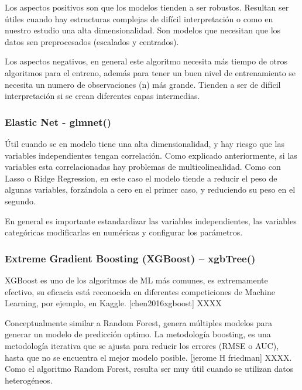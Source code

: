 \documentclass[
]{article}
\begin{document}
Los aspectos positivos son que los modelos tienden a ser robustos.
Resultan ser útiles cuando hay estructuras complejas de difícil
interpretación o como en nuestro estudio una alta dimensionalidad. Son
modelos que necesitan que los datos sen preprocesados (escalados y
centrados).

Los aspectos negativos, en general este algoritmo necesita más tiempo de
otros algoritmos para el entreno, además para tener un buen nivel de
entrenamiento se necesita un numero de observaciones (n) más grande.
Tienden a ser de difícil interpretación si se crean diferentes capas
intermedias.

\hypertarget{elastic-net---glmnet}{%
\subsubsection{Elastic Net - glmnet()}\label{elastic-net---glmnet}}

Útil cuando se en modelo tiene una alta dimensionalidad, y hay riesgo
que las variables independientes tengan correlación. Como explicado
anteriormente, si las variables esta correlacionadas hay problemas de
multicolinealidad. Como con Lasso o Ridge Regression, en este caso el
modelo tiende a reducir el peso de algunas variables, forzándola a cero
en el primer caso, y reduciendo su peso en el segundo.

En general es importante estandardizar las variables independientes, las
variables categóricas modificarlas en numéricas y configurar los
parámetros.

\hypertarget{extreme-gradient-boosting-xgboost-xgbtree}{%
\subsubsection{Extreme Gradient Boosting (XGBoost) --
xgbTree()}\label{extreme-gradient-boosting-xgboost-xgbtree}}

XGBoost es uno de los algoritmos de ML más comunes, es extremamente
efectivo, su eficacia está reconocida en diferentes competiciones de
Machine Learning, por ejemplo, en Kaggle. {[}chen2016xgboost{]} XXXX

Conceptualmente similar a Random Forest, genera múltiples modelos para
generar un modelo de predicción optimo. La metodología boosting, es una
metodología iterativa que se ajusta para reducir los errores (RMSE o
AUC), hasta que no se encuentra el mejor modelo posible. {[}jerome H
friedman{]} XXXX. Como el algoritmo Random Forest, resulta ser muy útil
cuando se utilizan datos heterogéneos.
\end{document}
